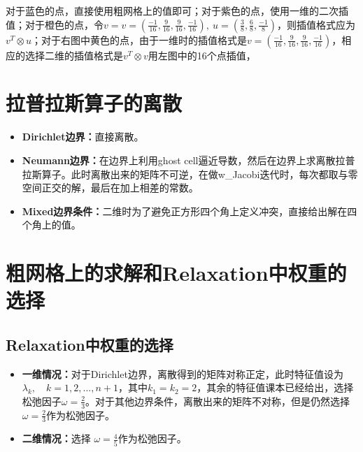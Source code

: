 \documentclass[UTF8]{ctexart}
\begin{document}
\begin{itemize}
\begin{center}
		\end{center}
		对于蓝色的点，直接使用粗网格上的值即可；对于紫色的点，使用一维的二次插值；对于橙色的点，令$v=v=\left(\frac{-1}{16}, \frac{9}{16}, \frac{9}{16}, \frac{-1}{16}\right),\ u=\left(\frac{3}{8},\frac{6}{8}, \frac{-1}{8}\right)$，则插值格式应为$v^T \otimes u$；对于右图中黄色的点，由于一维时的插值格式是$v=\left(\frac{-1}{16}, \frac{9}{16}, \frac{9}{16}, \frac{-1}{16}\right)$，相应的选择二维的插值格式是$v^T \otimes  v$用左图中的16个点插值，

	\end{itemize}
	\section{拉普拉斯算子的离散}
	\begin{itemize}
		\item \textbf{Dirichlet边界：}直接离散。
		\item \textbf{Neumann边界：}在边界上利用ghost cell逼近导数，然后在边界上求离散拉普拉斯算子。此时离散出来的矩阵不可逆，在做w\_Jacobi迭代时，每次都取与零空间正交的解，最后在加上相差的常数。
		\item \textbf{Mixed边界条件：}二维时为了避免正方形四个角上定义冲突，直接给出解在四个角上的值。
	\end{itemize}
	\section{粗网格上的求解和Relaxation中权重的选择}
	\subsection{Relaxation中权重的选择}
	\begin{itemize}
		\item \textbf{一维情况：}对于Dirichlet边界，离散得到的矩阵对称正定，此时特征值设为$\lambda_k,\quad k=1,2,...,n+1$，其中$k_1=k_2=2$，其余的特征值课本已经给出，选择松弛因子$\omega=\frac{2}{3}$。对于其他边界条件，离散出来的矩阵不对称，但是仍然选择$\omega=\frac{2}{3}$作为松弛因子。
		\item \textbf{二维情况：}选择 $\omega=\frac{4}{5}$作为松弛因子。
	\end{itemize}
	
\end{document}

